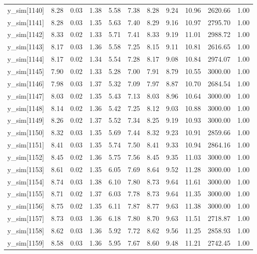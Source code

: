 \begin{table}[ht]
\begin{tabular}{rrrrrrrrrrr}
  y\_sim[1140] & 8.28 & 0.03 & 1.38 & 5.58 & 7.38 & 8.28 & 9.24 & 10.96 & 2620.66 & 1.00 \\ 
  y\_sim[1141] & 8.28 & 0.03 & 1.35 & 5.63 & 7.40 & 8.29 & 9.16 & 10.97 & 2795.70 & 1.00 \\ 
  y\_sim[1142] & 8.33 & 0.02 & 1.33 & 5.71 & 7.41 & 8.33 & 9.19 & 11.01 & 2988.72 & 1.00 \\ 
  y\_sim[1143] & 8.17 & 0.03 & 1.36 & 5.58 & 7.25 & 8.15 & 9.11 & 10.81 & 2616.65 & 1.00 \\ 
  y\_sim[1144] & 8.17 & 0.02 & 1.34 & 5.54 & 7.28 & 8.17 & 9.08 & 10.84 & 2974.07 & 1.00 \\ 
  y\_sim[1145] & 7.90 & 0.02 & 1.33 & 5.28 & 7.00 & 7.91 & 8.79 & 10.55 & 3000.00 & 1.00 \\ 
  y\_sim[1146] & 7.98 & 0.03 & 1.37 & 5.32 & 7.09 & 7.97 & 8.87 & 10.70 & 2684.54 & 1.00 \\ 
  y\_sim[1147] & 8.03 & 0.02 & 1.35 & 5.43 & 7.13 & 8.03 & 8.96 & 10.64 & 3000.00 & 1.00 \\ 
  y\_sim[1148] & 8.14 & 0.02 & 1.36 & 5.42 & 7.25 & 8.12 & 9.03 & 10.88 & 3000.00 & 1.00 \\ 
  y\_sim[1149] & 8.26 & 0.02 & 1.37 & 5.52 & 7.34 & 8.25 & 9.19 & 10.93 & 3000.00 & 1.00 \\ 
  y\_sim[1150] & 8.32 & 0.03 & 1.35 & 5.69 & 7.44 & 8.32 & 9.23 & 10.91 & 2859.66 & 1.00 \\ 
  y\_sim[1151] & 8.41 & 0.03 & 1.35 & 5.74 & 7.50 & 8.41 & 9.33 & 10.94 & 2864.16 & 1.00 \\ 
  y\_sim[1152] & 8.45 & 0.02 & 1.36 & 5.75 & 7.56 & 8.45 & 9.35 & 11.03 & 3000.00 & 1.00 \\ 
  y\_sim[1153] & 8.61 & 0.02 & 1.35 & 6.05 & 7.69 & 8.64 & 9.52 & 11.28 & 3000.00 & 1.00 \\ 
  y\_sim[1154] & 8.74 & 0.03 & 1.38 & 6.10 & 7.80 & 8.73 & 9.64 & 11.61 & 3000.00 & 1.00 \\ 
  y\_sim[1155] & 8.71 & 0.02 & 1.37 & 6.03 & 7.78 & 8.73 & 9.64 & 11.35 & 3000.00 & 1.00 \\ 
  y\_sim[1156] & 8.75 & 0.02 & 1.35 & 6.11 & 7.87 & 8.77 & 9.63 & 11.38 & 3000.00 & 1.00 \\ 
  y\_sim[1157] & 8.73 & 0.03 & 1.36 & 6.18 & 7.80 & 8.70 & 9.63 & 11.51 & 2718.87 & 1.00 \\ 
  y\_sim[1158] & 8.62 & 0.03 & 1.36 & 5.92 & 7.72 & 8.62 & 9.56 & 11.25 & 2858.93 & 1.00 \\ 
  y\_sim[1159] & 8.58 & 0.03 & 1.36 & 5.95 & 7.67 & 8.60 & 9.48 & 11.21 & 2742.45 & 1.00 \\ 

\end{tabular}
\end{table}
